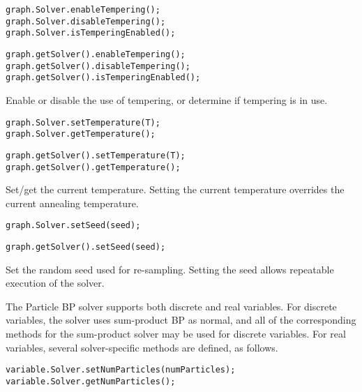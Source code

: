 \ifmatlab
\begin{lstlisting}
graph.Solver.enableTempering();
graph.Solver.disableTempering();
graph.Solver.isTemperingEnabled();
\end{lstlisting}
\fi

\ifjava
\begin{lstlisting}
graph.getSolver().enableTempering();
graph.getSolver().disableTempering();
graph.getSolver().isTemperingEnabled();
\end{lstlisting}
\fi

Enable or disable the use of tempering, or determine if tempering is in use.

\ifmatlab
\begin{lstlisting}
graph.Solver.setTemperature(T);
graph.Solver.getTemperature();
\end{lstlisting}
\fi

\ifjava
\begin{lstlisting}
graph.getSolver().setTemperature(T);
graph.getSolver().getTemperature();
\end{lstlisting}
\fi

Set/get the current temperature. Setting the current temperature overrides the current annealing temperature.

\ifmatlab
\begin{lstlisting}
graph.Solver.setSeed(seed);
\end{lstlisting}
\fi

\ifjava
\begin{lstlisting}
graph.getSolver().setSeed(seed);
\end{lstlisting}
\fi

Set the random seed used for re-sampling. Setting the seed allows repeatable execution of the solver.


The Particle BP solver supports both discrete and real variables. For discrete variables, the solver uses sum-product BP as normal, and all of the corresponding methods for the sum-product solver may be used for discrete variables. For real variables, several solver-specific methods are defined, as follows.

\label{sec:ParticleBPRealVariableSpecificMethods}

\ifmatlab
\begin{lstlisting}
variable.Solver.setNumParticles(numParticles);
variable.Solver.getNumParticles();
\end{lstlisting}
\fi

